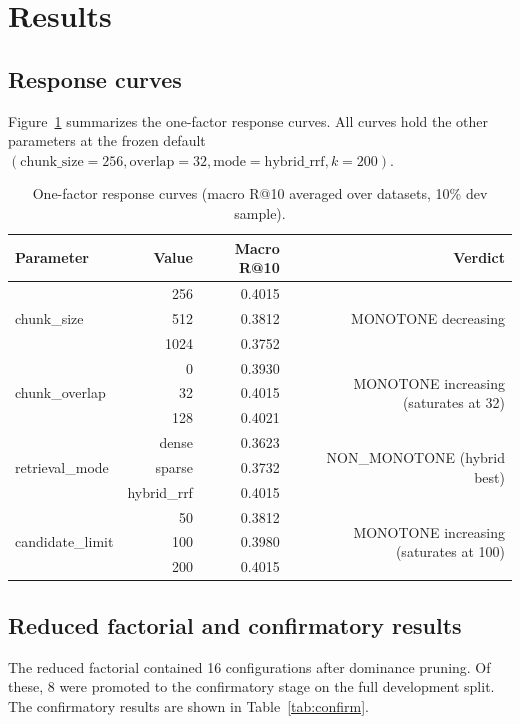 \documentclass[11pt,a4paper]{article}
\begin{document}
\section{Results}

\subsection{Response curves}
Figure~\ref{tab:curves} summarizes the one-factor response curves.
All curves hold the other parameters at the frozen default
$(\text{chunk\_size}=256, \text{overlap}=32,
\text{mode}=\text{hybrid\_rrf}, k=200)$.

\begin{table}[h]
\centering
\caption{One-factor response curves (macro R@10 averaged over
datasets, 10\% dev sample).}
\label{tab:curves}
\small
\begin{tabular}{l r r r}
\toprule
\textbf{Parameter} & \textbf{Value} & \textbf{Macro R@10}
  & \textbf{Verdict} \\
\midrule
\multirow{3}{*}{chunk\_size}
  & 256   & \num{0.4015} & \multirow{3}{*}{MONOTONE decreasing} \\
  & 512   & \num{0.3812} & \\
  & 1024  & \num{0.3752} & \\
\midrule
\multirow{3}{*}{chunk\_overlap}
  & 0     & \num{0.3930} & \multirow{3}{*}{MONOTONE increasing (saturates at 32)} \\
  & 32    & \num{0.4015} & \\
  & 128   & \num{0.4021} & \\
\midrule
\multirow{3}{*}{retrieval\_mode}
  & dense         & \num{0.3623} & \multirow{3}{*}{NON\_MONOTONE (hybrid best)} \\
  & sparse        & \num{0.3732} & \\
  & hybrid\_rrf   & \num{0.4015} & \\
\midrule
\multirow{3}{*}{candidate\_limit}
  & 50    & \num{0.3812} & \multirow{3}{*}{MONOTONE increasing (saturates at 100)} \\
  & 100   & \num{0.3980} & \\
  & 200   & \num{0.4015} & \\
\bottomrule
\end{tabular}
\end{table}

\subsection{Reduced factorial and confirmatory results}
The reduced factorial contained \num{16} configurations after
dominance pruning. Of these, \num{8} were promoted to the
confirmatory stage on the full development split. The confirmatory
results are shown in Table~\ref{tab:confirm}.
\end{document}
